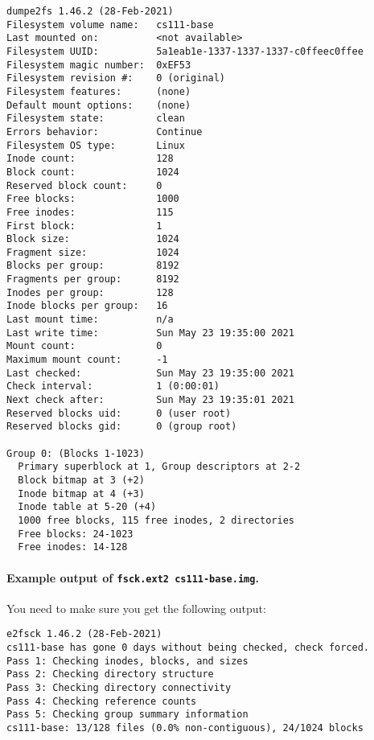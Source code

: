 \begin{lstlisting}
dumpe2fs 1.46.2 (28-Feb-2021)
Filesystem volume name:   cs111-base
Last mounted on:          <not available>
Filesystem UUID:          5a1eab1e-1337-1337-1337-c0ffeec0ffee
Filesystem magic number:  0xEF53
Filesystem revision #:    0 (original)
Filesystem features:      (none)
Default mount options:    (none)
Filesystem state:         clean
Errors behavior:          Continue
Filesystem OS type:       Linux
Inode count:              128
Block count:              1024
Reserved block count:     0
Free blocks:              1000
Free inodes:              115
First block:              1
Block size:               1024
Fragment size:            1024
Blocks per group:         8192
Fragments per group:      8192
Inodes per group:         128
Inode blocks per group:   16
Last mount time:          n/a
Last write time:          Sun May 23 19:35:00 2021
Mount count:              0
Maximum mount count:      -1
Last checked:             Sun May 23 19:35:00 2021
Check interval:           1 (0:00:01)
Next check after:         Sun May 23 19:35:01 2021
Reserved blocks uid:      0 (user root)
Reserved blocks gid:      0 (group root)

Group 0: (Blocks 1-1023)
  Primary superblock at 1, Group descriptors at 2-2
  Block bitmap at 3 (+2)
  Inode bitmap at 4 (+3)
  Inode table at 5-20 (+4)
  1000 free blocks, 115 free inodes, 2 directories
  Free blocks: 24-1023
  Free inodes: 14-128
\end{lstlisting}

\paragraph{Example output of \lstinline|fsck.ext2 cs111-base.img|.}

You need to make sure you get the following output:

\begin{lstlisting}
e2fsck 1.46.2 (28-Feb-2021)
cs111-base has gone 0 days without being checked, check forced.
Pass 1: Checking inodes, blocks, and sizes
Pass 2: Checking directory structure
Pass 3: Checking directory connectivity
Pass 4: Checking reference counts
Pass 5: Checking group summary information
cs111-base: 13/128 files (0.0% non-contiguous), 24/1024 blocks
\end{lstlisting}


